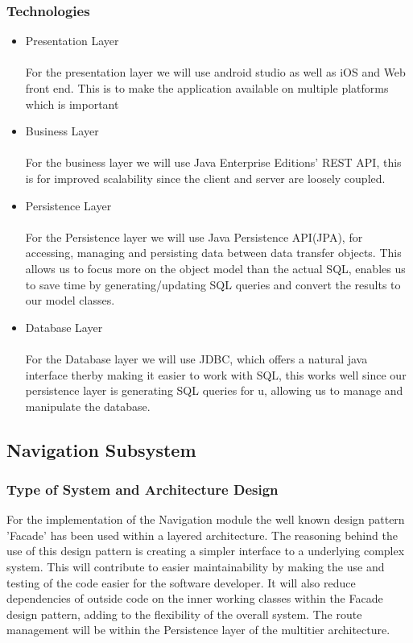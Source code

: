 \documentclass{article}
\begin{document}
	\subsubsection{Technologies}
			\begin{itemize}
 				\item Presentation Layer
				\\
				\\
				For the presentation layer we will use android studio as well as iOS and Web front end. This is to make the application available on multiple platforms which is important
 			
				
 			
				\item Business Layer
				\\
				\\
				For the business layer we will use Java Enterprise Editions' REST API, this is for improved scalability since the client and server are loosely coupled.
 				
			
 				\item Persistence Layer
				\\
				\\
				For the Persistence layer we will use Java Persistence API(JPA), for accessing, managing and persisting data between data transfer objects. This allows us to focus more on the object model than the actual SQL, enables us to save time by generating/updating SQL queries and convert the results to our model classes.
	
				
				\item Database Layer
				\\
				\\
				For the Database layer we will use JDBC, which offers a natural java interface therby making it easier to work with SQL, this works well since our persistence layer is generating SQL queries for u, allowing us to manage and manipulate the database.
				
			
 		\end{itemize}
 		
 		\subsection{Navigation Subsystem}
 		\subsubsection{Type of System and Architecture Design}
				For the implementation of the Navigation module the well known design pattern 'Facade' has been used within a layered architecture. The reasoning behind the use of this design pattern is creating a simpler interface to a underlying complex system. This will contribute to easier maintainability by making the use and testing of the code easier for the software developer. It will also reduce dependencies of outside code on the inner working classes within the Facade design pattern, adding to the flexibility of the overall system. The route management will be within the Persistence layer of the multitier architecture.
				
\end{document}
